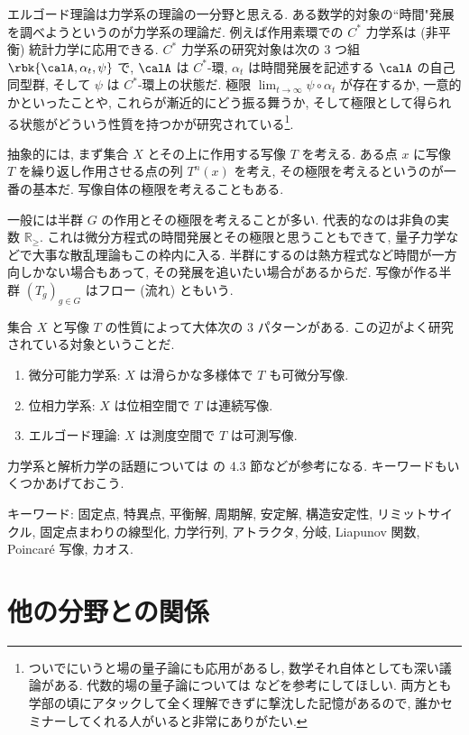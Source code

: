 \documentclass[openany, a4paper, oneside]{jsbook}
\begin{document}
エルゴード理論は力学系の理論の一分野と思える.
ある数学的対象の``時間"発展を調べようというのが力学系の理論だ.
例えば作用素環での $C^*$ 力学系は (非平衡) 統計力学に応用できる.
$C^*$ 力学系の研究対象は次の 3 つ組 $\rbk{\calA, \alpha_t, \psi}$ で,
$\calA$ は $C^*$-環, $\alpha_t$ は時間発展を記述する $\calA$ の自己同型群,
そして $\psi$ は $C^*$-環上の状態だ.
極限 $\lim_{t \to \infty} \psi \circ \alpha_t$ が存在するか, 一意的かといったことや,
これらが漸近的にどう振る舞うか, そして極限として得られる状態がどういう性質を持つかが研究されている\footnote{ついでにいうと場の量子論にも応用があるし, 数学それ自体としても深い議論がある.
代数的場の量子論については \cite{HansJurgenBorchers1, HansJurgenBorchers2} などを参考にしてほしい.
両方とも学部の頃にアタックして全く理解できずに撃沈した記憶があるので,
誰かセミナーしてくれる人がいると非常にありがたい.}.

抽象的には, まず集合 $X$ とその上に作用する写像 $T$ を考える.
ある点 $x$ に写像 $T$ を繰り返し作用させる点の列 $T^n (x)$ を考え,
その極限を考えるというのが一番の基本だ.
写像自体の極限を考えることもある.

一般には半群 $G$ の作用とその極限を考えることが多い.
代表的なのは非負の実数 $\mathbb{R}_{\geq}$.
これは微分方程式の時間発展とその極限と思うこともできて,
量子力学などで大事な散乱理論もこの枠内に入る.
半群にするのは熱方程式など時間が一方向しかない場合もあって,
その発展を追いたい場合があるからだ.
写像が作る半群 $(T_g)_{g \in G}$ はフロー (流れ) ともいう.

集合 $X$ と写像 $T$ の性質によって大体次の 3 パターンがある.
この辺がよく研究されている対象ということだ.
\begin{enumerate}
\item 微分可能力学系: $X$ は滑らかな多様体で $T$ も可微分写像.
\item 位相力学系: $X$ は位相空間で $T$ は連続写像.
\item エルゴード理論: $X$ は測度空間で $T$ は可測写像.
\end{enumerate}
力学系と解析力学の話題については \cite{NakamuraYamamoto1, NakamuraYamamoto2} の 4.3 節などが参考になる.
キーワードもいくつかあげておこう.

キーワード: 固定点, 特異点, 平衡解, 周期解, 安定解, 構造安定性, リミットサイクル,
固定点まわりの線型化, 力学行列, アトラクタ, 分岐, Liapunov 関数, Poincar\'e 写像, カオス.
\section{他の分野との関係}
\end{document}
